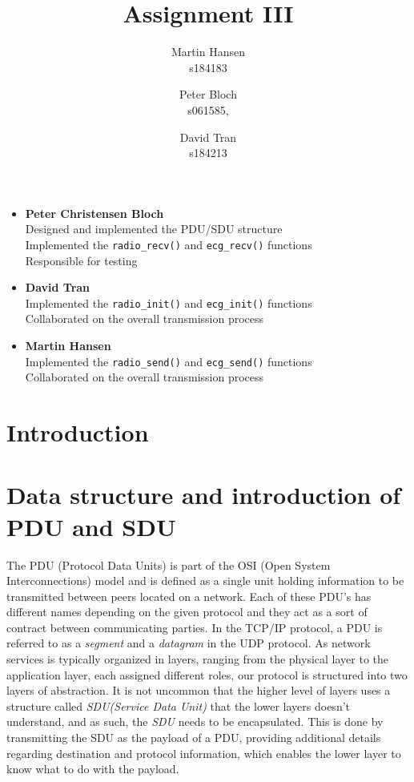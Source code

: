 \documentclass{article}
\title{Assignment III}
\author{Martin Hansen \\ s184183 \and Peter Bloch \\s061585, \and David Tran \\s184213}
\newcommand{\code}[1]{\texttt{#1}}
\begin{document}
	
	\maketitle
	
	
	\begin{itemize}
		\item \textbf{Peter Christensen Bloch}\\
			Designed and implemented the PDU/SDU structure\\
			Implemented the \code{radio\_recv()} and \code{ecg\_recv()} functions\\
			Responsible for testing	
		\item \textbf{David Tran}\\
			Implemented the \code{radio\_init()} and \code{ecg\_init()} functions\\
			Collaborated on the overall transmission process
		\item \textbf{Martin Hansen}\\
			Implemented the \code{radio\_send()} and \code{ecg\_send()} functions\\
			Collaborated on the overall transmission process
			
	\end{itemize}
	 
	
	\pagebreak
	
	\tableofcontents
	
	\pagebreak
	
	\section{Introduction}
	
	\section[Data structure]{Data structure and introduction of PDU and SDU}
	The PDU (Protocol Data Units) is part of the OSI (Open System Interconnections) model and is defined as a single unit holding information to be transmitted between peers located on a network. Each of these PDU's has different names depending on the given protocol and they act as a sort of contract between communicating parties. In the TCP/IP protocol, a PDU is referred to as a \textit{segment} and a \textit{datagram} in the UDP protocol. As network services is typically organized in layers, ranging from the physical layer to the application layer, each assigned different roles, our protocol is structured into two layers of abstraction. It is not uncommon that the higher level of layers uses a structure called \textit{SDU(Service Data Unit)} that the lower layers doesn't understand, and as such, the \textit{SDU} needs to be encapsulated. This is done by transmitting the SDU as the payload of a PDU, providing additional details regarding destination and protocol information, which enables the lower layer to know what to do with the payload\cite{PDU}.\\
	
\end{document}
